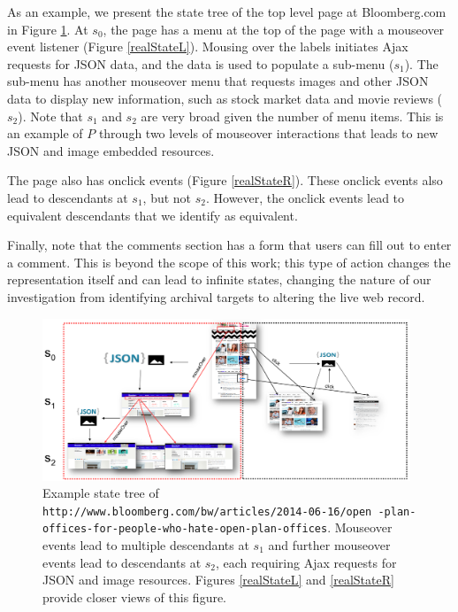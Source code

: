 \documentclass{sig-alternate}
\begin{document}
As an example, we present the state tree of the top level page at Bloomberg.com in Figure \ref{realState}. At $s_0$, the page has a menu at the top of the page with a mouseover event listener (Figure \ref{realStateL}). Mousing over the labels initiates Ajax requests for JSON data, and the data is used to populate a sub-menu ($s_1$). The sub-menu has another mouseover menu that requests images and other JSON data to display new information, such as stock market data and movie reviews ($s_2$). Note that $s_1$ and $s_2$ are very broad given the number of menu items. This is an example of $P$ through two levels of mouseover interactions that leads to new JSON and image embedded resources. 

The page also has onclick events (Figure \ref{realStateR}). These onclick events also lead to descendants at $s_1$, but not $s_2$. However, the onclick events lead to equivalent descendants that we identify as equivalent.

Finally, note that the comments section has a form that users can fill out to enter a comment. This is beyond the scope of this work; this type of action changes the representation itself and can lead to infinite states, changing the nature of our investigation from identifying archival targets to altering the live web record.



\begin{figure}[hp]
\centering
\includegraphics[width=0.98\textwidth]{./imgs/realStates4.png}
\caption{Example state tree of \texttt{http://www.bloomberg.com/bw/articles/2014-06-16/open -plan-offices-for-people-who-hate-open-plan-offices}. Mouseover events lead to multiple descendants at $s_1$ and further mouseover events lead to descendants at $s_2$, each requiring Ajax requests for JSON and image resources. Figures \ref{realStateL} and \ref{realStateR} provide closer views of this figure.}
\label{realState}
\end{figure}
\end{document}
